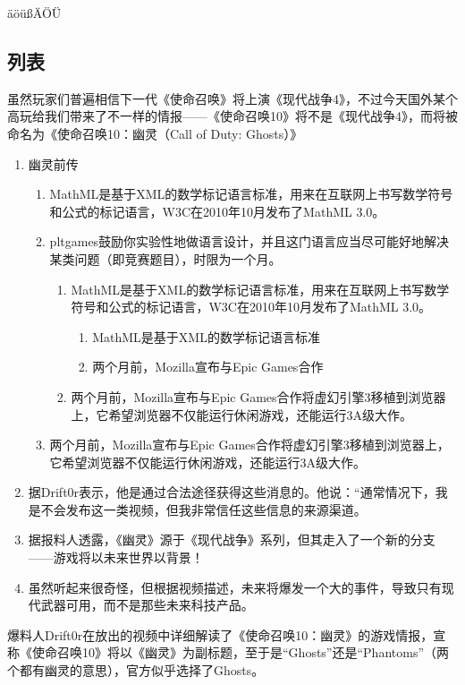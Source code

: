 \documentclass[%
               amsthm,
              ]{xjtubsc}
\begin{document}
äöüßÄÖÜ

\subsection{列表}
虽然玩家们普遍相信下一代《使命召唤》将上演《现代战争4》，不过今天国外某个高玩给我们带来了不一样的情报——《使命召唤10》将不是《现代战争4》，而将被命名为《使命召唤10：幽灵（Call of Duty: Ghosts）》
\begin{enumerate}
\item 幽灵前传
  \begin{enumerate}
      \item MathML是基于XML的数学标记语言标准，用来在互联网上书写数学符号和公式的标记语言，W3C在2010年10月发布了MathML 3.0。
       \item pltgames鼓励你实验性地做语言设计，并且这门语言应当尽可能好地解决某类问题（即竞赛题目），时限为一个月。
        \begin{enumerate}
        \item MathML是基于XML的数学标记语言标准，用来在互联网上书写数学符号和公式的标记语言，W3C在2010年10月发布了MathML 3.0。
          \begin{enumerate}
          \item MathML是基于XML的数学标记语言标准
          \item 两个月前，Mozilla宣布与Epic Games合作
          \end{enumerate}
        \item 两个月前，Mozilla宣布与Epic Games合作将虚幻引擎3移植到浏览器上，它希望浏览器不仅能运行休闲游戏，还能运行3A级大作。
        \end{enumerate}
      \item 两个月前，Mozilla宣布与Epic Games合作将虚幻引擎3移植到浏览器上，它希望浏览器不仅能运行休闲游戏，还能运行3A级大作。
   \end{enumerate}
\item 据Drift0r表示，他是通过合法途径获得这些消息的。他说：“通常情况下，我是不会发布这一类视频，但我非常信任这些信息的来源渠道。
\item 据报料人透露，《幽灵》源于《现代战争》系列，但其走入了一个新的分支——游戏将以未来世界以背景！
\item 虽然听起来很奇怪，但根据视频描述，未来将爆发一个大的事件，导致只有现代武器可用，而不是那些未来科技产品。
\end{enumerate}
爆料人Drift0r在放出的视频中详细解读了《使命召唤10：幽灵》的游戏情报，宣称《使命召唤10》将以《幽灵》为副标题，至于是“Ghosts”还是“Phantoms”（两个都有幽灵的意思），官方似乎选择了Ghosts。
\end{document}
